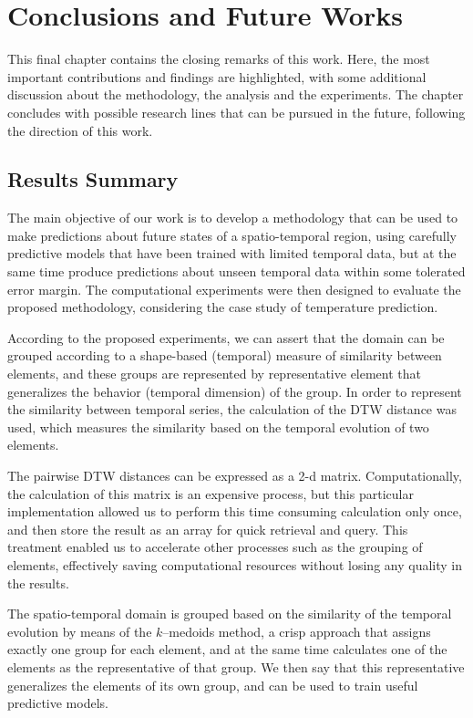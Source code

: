 \chapter{Conclusions and Future Works}
\label{chapter_Conclusions}

This final chapter contains the closing remarks of this work. Here, the most important contributions and findings are highlighted, with some additional discussion about the methodology, the analysis and the experiments. The chapter concludes with possible research lines that can be pursued in the future, following the direction of this work.
	
\section{Results Summary}
\label{Sec:ResultsSummary}

The main objective of our work is to develop a methodology that can be used to make predictions about future states of a spatio-temporal region, using carefully predictive models that have been trained with limited temporal data, but at the same time produce predictions about unseen temporal data within some tolerated error margin. The computational experiments were then designed to evaluate the proposed methodology, considering the case study of temperature prediction.

According to the proposed experiments, we can assert that the domain can be grouped according to a shape-based (temporal) measure of similarity between elements, and these groups are represented by representative element that generalizes the behavior (temporal dimension) of the group. In order to represent the similarity between temporal series, the calculation of the DTW distance was used, which measures the similarity based on the temporal evolution of two elements.

The pairwise DTW distances can be expressed as a 2-d matrix. Computationally, the calculation of this matrix is an expensive process, but this particular implementation allowed us to perform this time consuming calculation only once, and then store the result as an array for quick retrieval and query. This treatment enabled us to accelerate other processes such as the grouping of elements, effectively saving computational resources without losing any quality in the results.

The spatio-temporal domain is grouped based on the similarity of the temporal evolution by means of the $k$--medoids method, a crisp approach that assigns exactly one group for each element, and at the same time calculates one of the elements as the representative of that group. We then say that this representative generalizes the elements of its own group, and can be used to train useful predictive models.


